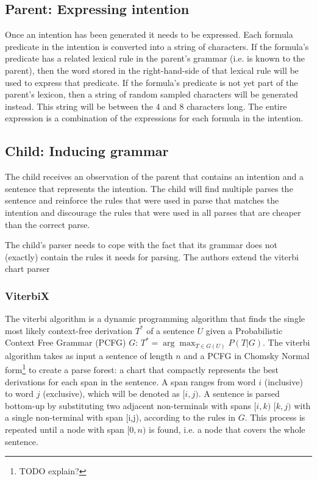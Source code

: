 \documentclass[a4paper]{article}
\begin{document}
\subsection{Parent: Expressing intention}
Once an intention has been generated it needs to be expressed. Each formula predicate in the intention is converted into a string of characters. If the formula's predicate has a related lexical rule in the parent's grammar (i.e. is known to the parent), then the word stored in the right-hand-side of that lexical rule will be used to express that predicate. If the formula's predicate is not yet part of the parent's lexicon, then a string of random sampled characters will be generated instead. This string will be between the 4 and 8 characters long. The entire expression is a combination of the expressions for each formula in the intention.

\subsection{Child: Inducing grammar} %
The child receives an observation of the parent that contains an intention and a sentence that represents the intention. The child will find multiple parses the sentence and reinforce the rules that were used in parse that matches the intention and discourage the rules that were used in all parses that are cheaper than the correct parse.

The child's parser needs to cope with the fact that its grammar does not (exactly) contain the rules it needs for parsing. The authors extend the viterbi chart parser 

\subsubsection{ViterbiX} %
The viterbi algorithm is a dynamic programming algorithm that finds the single most likely context-free derivation $T^*$ of a sentence $U$ given a Probabilistic Context Free Grammar (PCFG) $G$: $T^* = \arg \max_{T \in G(U)} P(T|G)$. The viterbi algorithm takes as input a sentence of length $n$ and a PCFG in Chomsky Normal form\footnote{TODO explain?} to create a parse forest: a chart that compactly represents the best derivations for each span in the sentence. A span ranges from word $i$ (inclusive) to word $j$ (exclusive), which will be denoted as $[i,j)$. A sentence is parsed bottom-up by substituting two adjacent non-terminals with spans $[i,k)$ $[k,j)$ with a single non-terminal with span [i,j), according to the rules in $G$. This process is repeated until a node with span $[0,n)$ is found, i.e. a node that covers the whole sentence.
\end{document}
